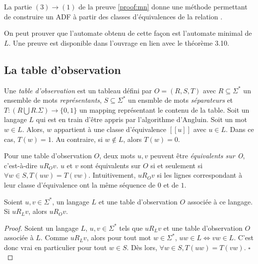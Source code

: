 	\begin{corollary}
		La partie $(3)\rightarrow(1)$ de la preuve \ref{proof:mn} donne une méthode permettant de construire un ADF à partir des classes d'équivalences de la relation \rl.
	\end{corollary}

On peut prouver que l'automate obtenu de cette façon est l'automate minimal de $L$. Une preuve est disponible dans l'ouvrage \cite{Hopcroft79} en lien avec le théorème 3.10.



  \subsection{La table d'observation}

	Une \emph{table d'observation} est un tableau défini par $O=(R,S,T)$ avec $R\subseteq\Sigma^*$ un ensemble de mots \emph{représentants}, $S\subseteq\Sigma^*$ un ensmble de mots \emph{séparateurs} et $T:(R\bigcup R.\Sigma)\rightarrow\{0,1\}$ un mapping représentant le contenu de la table.\cite{Neider14}
	Soit un langage $L$ qui est en train d'être appris par l'algorithme d'Angluin. Soit un mot $w\in L$. Alors, $w$ appartient à une classe d'équivalence $[[u]]$ avec $u\in L$. Dans ce cas, $T(w)=1$. Au contraire, si $w\notin L$, alors $T(w)=0$.

	Pour une table d'observation $O$, deux mots $u,v$ peuvent être \emph{équivalents sur O}, c'est-à-dire $uR_Ov$. $u$ et $v$ sont équivalents sur $O$ si et seulement si $\forall w \in S, T(uw)=T(vw)$. Intuitivement, $uR_Ov$ si les lignes correspondant à leur classe d'équivalence ont la même séquence de $0$ et de $1$.

	\begin{proposition}
		Soient $u,v \in \Sigma^*$, un langage $L$ et une table d'observation $O$ associée à ce langage. Si $uR_Lv$, alors $uR_Ov$.
	\end{proposition}

	\begin{proof}
		Soient un langage $L$, $u,v \in \Sigma^*$ tels que $uR_Lv$ et une table d'observation $O$ associée à $L$.
		Comme $uR_Lv$, alors pour tout mot $w\in\Sigma^*$, $uw\in L \iff vw\in L$. C'est donc vrai en particulier pour tout $w\in S$. Dès lors, $\forall w \in S, T(uw)=T(vw)$.
		\hfill$\square$
	\end{proof}

